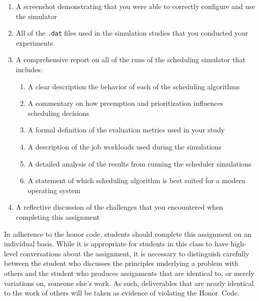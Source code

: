 \begin{enumerate}

  \itemsep0in

  \item A screenshot demonstrating that you were able to correctly configure and use the simulator

  \item All of the {\tt .dat} files used in the simulation studies that you conducted your experiments

  \item A comprehensive report on all of the runs of the scheduling simulator that includes:

  \begin{enumerate}

  \itemsep0in
    \item A clear description the behavior of each of the scheduling algorithms
    \item A commentary on how preemption and prioritization influences scheduling decisions
    \item A formal definition of the evaluation metrics used in your study
    \item A description of the job workloads used during the simulations
    \item A detailed analysis of the results from running the scheduler simulations
    \item A statement of which scheduling algorithm is best suited for a modern operating system

  \end{enumerate}

  \item A reflective discussion of the challenges that you encountered when completing this assignment

\end{enumerate}

In adherence to the honor code, students should complete this assignment on an individual basis. While it is appropriate
for students in this class to have high-level conversations about the assignment, it is necessary to distinguish
carefully between the student who discusses the principles underlying a problem with others and the student who produces
assignments that are identical to, or merely variations on, someone else's work.  As such, deliverables that are nearly
identical to the work of others will be taken as evidence of violating the \mbox{Honor Code}.  

  

